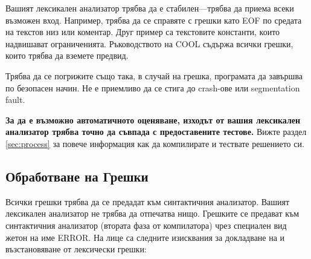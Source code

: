 \documentclass[11pt]{article}
\begin{document}
Вашият лексикален анализатор трябва да е стабилен---трябва да приема всеки възможен вход.
Например, трябва да се справяте с грешки като EOF по средата на текстов низ или коментар.
Друг пример са текстовите константи, които надвишават ограниченията.
Ръководството на COOL съдържа всички грешки, които трябва да вземете предвид.

Трябва да се погрижите също така, в случай на грешка, програмата да завършва по безопасен начин.
Не е приемливо да се стига до crash-ове или segmentation fault.

\textbf{За да е възможно автоматичното оценяване, изходът от вашия лексикален анализатор трябва точно да съвпада с предоставените тестове.}
Вижте раздел \ref{sec:process} за повече информация как да компилирате и тествате решението си.

\subsection{Обработване на Грешки}\label{sec:errors}

Всички грешки трябва да се предадат към синтактичния анализатор.
Вашият лексикален анализатор не трябва да отпечатва нищо.
Грешките се предават към синтактичния анализатор (втората фаза от компилатора) чрез специален вид жетон на име ERROR.
На лице са следните изисквания за докладване на и възстановяване от лексически грешки:
\end{document}

